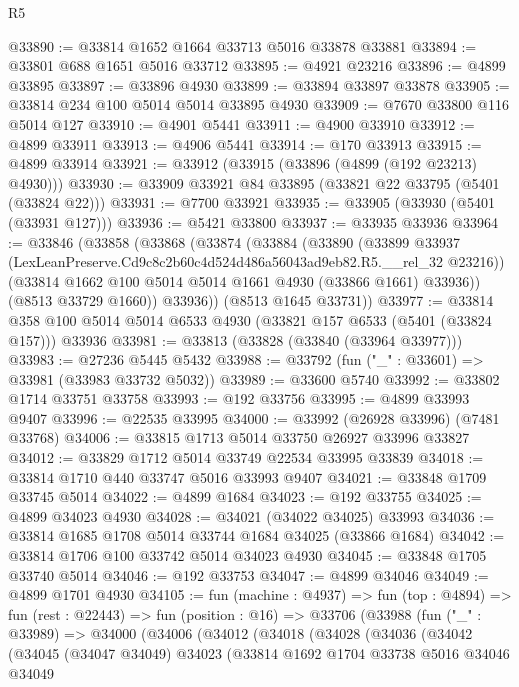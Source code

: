 \begin{lexlean}{R5}
\begin{coremodule}
@33890 := @33814 @1652 @1664 @33713 @5016 @33878 @33881
@33894 := @33801 @688 @1651 @5016 @33712
@33895 := @4921 @23216
@33896 := @4899 @33895
@33897 := @33896 @4930
@33899 := @33894 @33897 @33878
@33905 := @33814 @234 @100 @5014 @5014 @33895 @4930
@33909 := @7670 @33800 @116 @5014 @127
@33910 := @4901 @5441
@33911 := @4900 @33910
@33912 := @4899 @33911
@33913 := @4906 @5441
@33914 := @170 @33913
@33915 := @4899 @33914
@33921 := @33912 (@33915 (@33896 (@4899 (@192 @23213) @4930)))
@33930 := @33909 @33921 @84 @33895 (@33821 @22 @33795 (@5401 (@33824 @22)))
@33931 := @7700 @33921
@33935 := @33905 (@33930 (@5401 (@33931 @127)))
@33936 := @5421 @33800
@33937 := @33935 @33936
@33964 := @33846
    (@33858
      (@33868
        (@33874
          (@33884
            (@33890
              (@33899 @33937 (LexLeanPreserve.Cd9c8c2b60c4d524d486a56043ad9eb82.R5.__rel_32 @23216))
              (@33814 @1662 @100 @5014 @5014 @1661 @4930 (@33866 @1661) @33936))
            (@8513 @33729 @1660))
          @33936))
      (@8513 @1645 @33731))
@33977 := @33814 @358 @100 @5014 @5014 @6533 @4930 (@33821 @157 @6533 (@5401 (@33824 @157))) @33936
@33981 := @33813 (@33828 (@33840 (@33964 @33977)))
@33983 := @27236 @5445 @5432
@33988 := @33792 (fun ("_" : @33601) => @33981 (@33983 @33732 @5032))
@33989 := @33600 @5740
@33992 := @33802 @1714 @33751 @33758
@33993 := @192 @33756
@33995 := @4899 @33993 @9407
@33996 := @22535 @33995
@34000 := @33992 (@26928 @33996) (@7481 @33768)
@34006 := @33815 @1713 @5014 @33750 @26927 @33996 @33827
@34012 := @33829 @1712 @5014 @33749 @22534 @33995 @33839
@34018 := @33814 @1710 @440 @33747 @5016 @33993 @9407
@34021 := @33848 @1709 @33745 @5014
@34022 := @4899 @1684
@34023 := @192 @33755
@34025 := @4899 @34023 @4930
@34028 := @34021 (@34022 @34025) @33993
@34036 := @33814 @1685 @1708 @5014 @33744 @1684 @34025 (@33866 @1684)
@34042 := @33814 @1706 @100 @33742 @5014 @34023 @4930
@34045 := @33848 @1705 @33740 @5014
@34046 := @192 @33753
@34047 := @4899 @34046
@34049 := @4899 @1701 @4930
@34105 := fun (machine : @4937) =>
  fun (top : @4894) =>
  fun (rest : @22443) =>
  fun (position : @16) =>
  @33706
    (@33988
      (fun ("_" : @33989) =>
      @34000
        (@34006
          (@34012
            (@34018
              (@34028
                (@34036
                  (@34042
                    (@34045
                      (@34047 @34049)
                      @34023
                      (@33814
                        @1692
                        @1704
                        @33738
                        @5016
                        @34046
                        @34049

\end{coremodule}
\end{lexlean}
